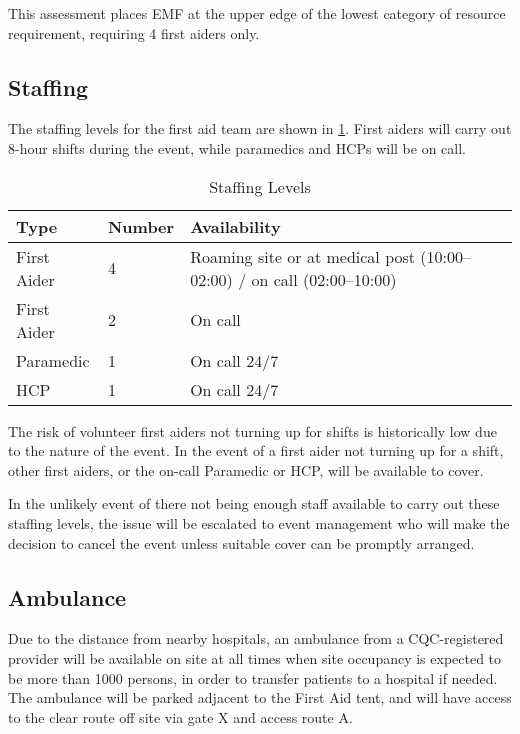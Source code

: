 This assessment places EMF at the upper edge of the lowest category of resource
requirement, requiring 4 first aiders only.

\subsection{Staffing}

The staffing levels for the first aid team are shown in \cref{table:fastaffing}.
First aiders will carry out 8-hour shifts during the event, while paramedics
and HCPs will be on call.

\begin{table}[h!]
\caption{Staffing Levels}
\label{table:fastaffing}
\centering
\begin{tabular}{| l l l |}
    \hline
        \textbf{Type} & \textbf{Number} & \textbf{Availability} \\
    \hline
        First Aider & 4 & Roaming site or at medical post (10:00--02:00) / on call (02:00--10:00) \\
        First Aider & 2 & On call \\
        Paramedic & 1 & On call 24/7 \\
        HCP & 1 & On call 24/7 \\
    \hline
\end{tabular}
\end{table}

The risk of volunteer first aiders not turning up for shifts is historically low due
to the nature of the event. In the event of a first aider not turning up for a shift,
other first aiders, or the on-call Paramedic or HCP, will be available to cover.

In the unlikely event of there not being enough staff available to carry out these
staffing levels, the issue will be escalated to event management who will make the
decision to cancel the event unless suitable cover can be promptly arranged.

\subsection{Ambulance}

Due to the distance from nearby hospitals, an ambulance from a CQC-registered provider 
will be available on site at all times when site occupancy is expected to be more than
1000 persons, in order to transfer patients to a hospital if needed. The ambulance will be parked
adjacent to the First Aid tent, and will have access to the clear route off site via gate
X and access route A.

